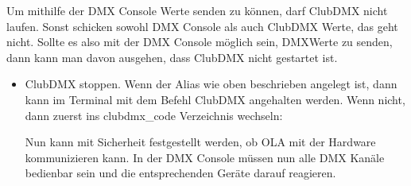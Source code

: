 \documentclass[letterpaper,10pt,ngerman]{sphinxmanual}
\begin{document}
Um mithilfe der DMX Console Werte senden zu können, darf ClubDMX nicht laufen.
Sonst schicken sowohl DMX Console als auch ClubDMX Werte, das geht nicht. Sollte es
also mit der DMX Console möglich sein, DMX\sphinxhyphen{}Werte zu senden, dann kann man
davon ausgehen, dass ClubDMX nicht gestartet ist.
\begin{itemize}
\item {} 
ClubDMX stoppen.
Wenn der Alias  wie oben beschrieben angelegt ist,
dann kann im Terminal mit
dem Befehl  ClubDMX angehalten werden. Wenn nicht, dann zuerst
ins clubdmx\_code Verzeichnis wechseln:

\begin{sphinxVerbatim}[commandchars=\\\{\}]
 
 
\end{sphinxVerbatim}

Nun kann mit
Sicherheit festgestellt werden, ob OLA mit der Hardware kommunizieren kann.
In der DMX Console müssen nun alle DMX Kanäle bedienbar sein und die
entsprechenden Geräte darauf reagieren.

\end{itemize}

\end{document}
